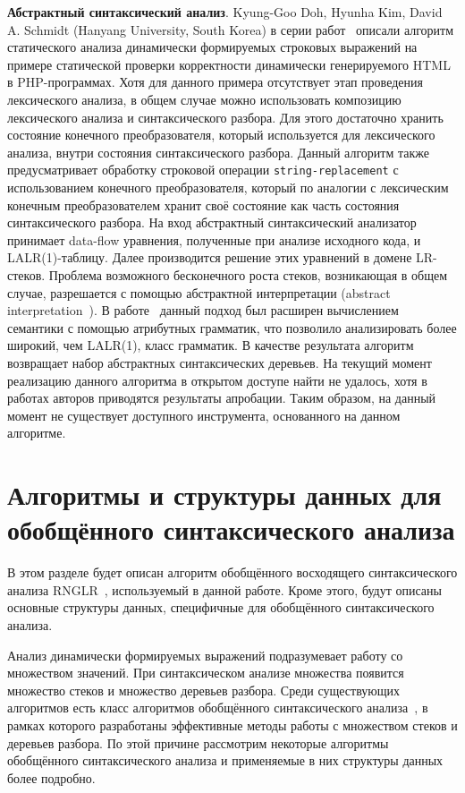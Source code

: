 \textbf{Абстрактный синтаксический анализ}. Kyung-Goo Doh,  Hyunha Kim, David A. Schmidt (Hanyang University, South Korea) в серии работ~\cite{LrAbstract1, LrAbstract2, LRAbstractParsingSema} описали алгоритм статического анализа динамически формируемых строковых выражений на примере статической проверки корректности динамически генерируемого HTML в PHP-программах. Хотя для данного примера отсутствует этап проведения лексического анализа, в общем случае можно использовать композицию лексического анализа и синтаксического разбора. Для этого достаточно хранить состояние конечного преобразователя, который используется для лексического анализа, внутри состояния синтаксического разбора. Данный алгоритм также предусматривает обработку строковой операции \verb|string-replacement| с использованием конечного преобразователя, который по аналогии с лексическим конечным преобразователем хранит своё состояние как часть состояния синтаксического разбора. На вход абстрактный синтаксический анализатор принимает data-flow  уравнения, полученные при анализе исходного кода, и  LALR(1)-таблицу. Далее производится решение этих уравнений в домене LR-стеков. Проблема возможного бесконечного роста стеков, возникающая в общем случае, разрешается с помощью абстрактной интерпретации (abstract interpretation~\cite{AbstractInterpretation}). В работе~\cite{LRAbstractParsingSema} данный подход был расширен вычислением семантики с помощью атрибутных грамматик, что позволило анализировать более широкий, чем LALR(1), класс грамматик. В качестве результата алгоритм возвращает набор абстрактных синтаксических деревьев. На текущий момент реализацию данного алгоритма в открытом доступе найти не удалось, хотя в работах авторов приводятся результаты апробации. Таким образом, на данный момент не существует доступного инструмента, основанного на данном алгоритме.

\section{Алгоритмы и структуры данных для обобщённого синтаксического анализа}

В этом разделе будет описан алгоритм обобщённого восходящего синтаксического анализа RNGLR~\cite{RNGLR}, используемый в данной работе. Кроме этого, будут описаны основные структуры данных, специфичные для обобщённого синтаксического анализа.

Анализ динамически формируемых выражений подразумевает работу со множеством значений. При синтаксическом анализе множества появится множество стеков и множество деревьев разбора. Среди существующих алгоритмов есть класс алгоритмов обобщённого синтаксического анализа~\cite{GeneralisedlrBIG}, в рамках которого разработаны эффективные методы работы с множеством стеков и деревьев разбора. По этой причине рассмотрим некоторые алгоритмы обобщённого синтаксического анализа и применяемые в них структуры данных более подробно.

